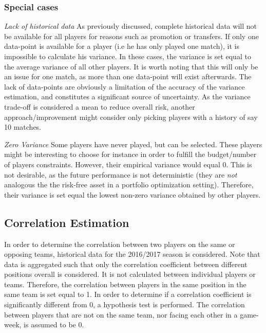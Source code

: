 \subsubsection{Special cases}
\textit{Lack of historical data}\newline
As previously discussed, complete historical data will not be available for all players for reasons such as promotion or transfers. If only one data-point is available for a player (i.e he has only played one match), it is impossible to calculate his variance. In these cases, the variance is set equal to the average variance of all other players. It is worth noting that this will only be an issue for one match, as more than one data-point will exist afterwards. The lack of data-points are obviously a limitation of the accuracy of the variance estimation, and constitutes a significant source of uncertainty. As the variance trade-off is considered a mean to reduce overall risk, another approach/improvement might consider only picking players with a history of say 10 matches. \newpar

\textit{Zero Variance}\newline
Some players have never played, but can be selected. These players might be interesting to choose for instance in order to fulfill the budget/number of players constraints. However, their empirical variance would equal 0. This is not desirable, as the future performance is not deterministic (they are \textit{not} analogous the the risk-free asset in a portfolio optimization setting). Therefore, their variance is set equal the lowest non-zero variance obtained by other players.

\subsection{Correlation Estimation}

In order to determine the correlation between two players on the same or opposing teams, historical data for the 2016/2017 season is considered. Note that data is aggregated such that only the correlation coefficient between different positions overall is considered. It is not calculated between individual players or teams. Therefore, the correlation between players in the same position in the same team is set equal to 1. In order to determine if a correlation coefficient is significantly different from 0, a hypothesis test is performed. The correlation between players that are not on the same team, nor facing each other in a game-week, is assumed to be 0.\newpar


